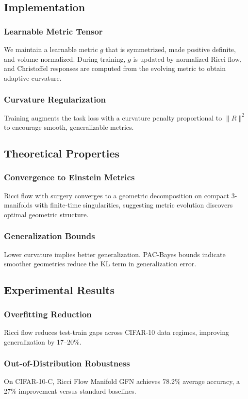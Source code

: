 \documentclass{article}
\numberwithin{equation}{section}
\begin{document}
\subsection{Implementation}
\subsubsection{Learnable Metric Tensor}
We maintain a learnable metric $g$ that is symmetrized, made positive definite, and volume-normalized. During training, $g$ is updated by normalized Ricci flow, and Christoffel responses are computed from the evolving metric to obtain adaptive curvature.

\subsubsection{Curvature Regularization}
Training augments the task loss with a curvature penalty proportional to $\|R\|^2$ to encourage smooth, generalizable metrics.

\subsection{Theoretical Properties}
\subsubsection{Convergence to Einstein Metrics}
Ricci flow with surgery converges to a geometric decomposition on compact 3-manifolds with finite-time singularities, suggesting metric evolution discovers optimal geometric structure.

\subsubsection{Generalization Bounds}
Lower curvature implies better generalization. PAC-Bayes bounds indicate smoother geometries reduce the KL term in generalization error.

\subsection{Experimental Results}
\subsubsection{Overfitting Reduction}
Ricci flow reduces test-train gaps across CIFAR-10 data regimes, improving generalization by 17--20\%.

\subsubsection{Out-of-Distribution Robustness}
On CIFAR-10-C, Ricci Flow Manifold GFN achieves 78.2\% average accuracy, a 27\% improvement versus standard baselines.
\end{document}
